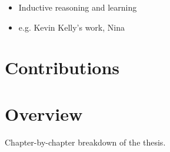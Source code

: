 \begin{notes} \begin{itemize}
        \item Inductive reasoning and learning
        \item e.g. Kevin Kelly's work, Nina \end{itemize} \end{notes}

\section{Contributions}


\section{Overview}

\begin{notes}
    Chapter-by-chapter breakdown of the thesis.
\end{notes}
